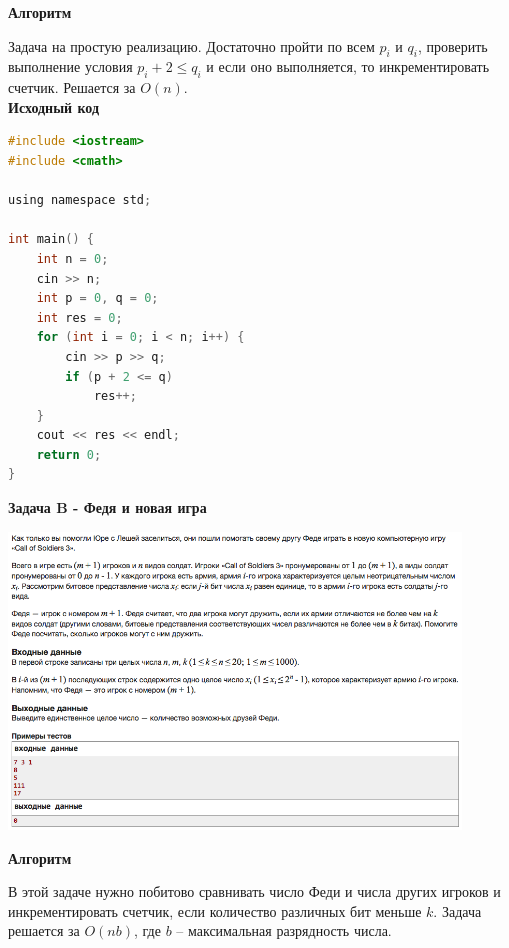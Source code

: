 \documentclass[a4paper,12pt]{article}
\begin{document}
\textbf{{\large Алгоритм}}

Задача на простую реализацию. Достаточно пройти по всем $p_i$ и $q_i$, проверить выполнение условия $p_i + 2 \leq q_i$ и если оно выполняется, то инкрементировать счетчик. Решается за $O(n)$. \\

\textbf{{\large Исходный код}} \\
\begin{lstlisting}[language=C]
#include <iostream>
#include <cmath>

using namespace std;

int main() {
    int n = 0;
    cin >> n;
    int p = 0, q = 0;
    int res = 0;
    for (int i = 0; i < n; i++) {
        cin >> p >> q;
        if (p + 2 <= q)
            res++;
    }
    cout << res << endl;
    return 0;
}
\end{lstlisting}

\newpage
\textbf{{\large Задача B - Федя и новая игра}}

\begin{center}
\includegraphics[width=0.9\textwidth]{C_267/C_267_B.png}\\ [1cm]
\end{center}

\textbf{{\large Алгоритм}}

В этой задаче нужно побитово сравнивать число Феди и числа других игроков и инкрементировать счетчик, если количество различных бит меньше $k$. Задача решается за $O(nb)$, где $b$ -- максимальная разрядность числа.
\end{document}
